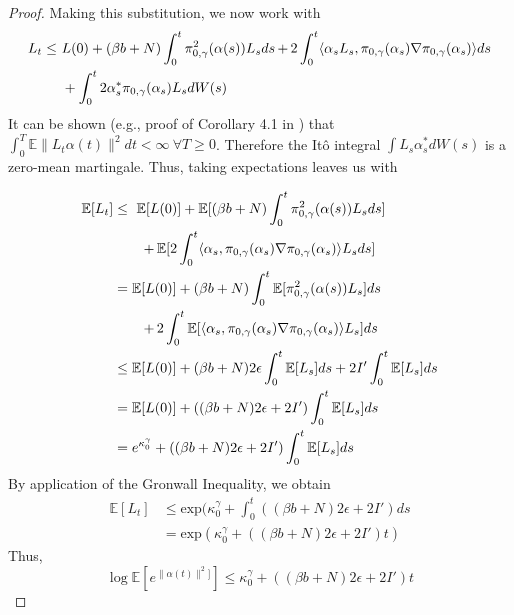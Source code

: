 \documentclass[journal,onecolumn]{IEEEtran}
\newcommand{\step}{\epsilon}
\newcommand{\grad}{\nabla}
\newcommand{\CE}{\mathbb{E}}
\newcommand{\alt}{\alpha(t)}
\newcommand{\als}{\alpha(s)}
\newcommand{\altss}{\alpha_s}
\newcommand{\Lt}{L_t}
\newcommand{\Lss}{L_s}
\newcommand{\browns}{W(s)}
\newcommand{\dimn}{N}
\newcommand{\kn}{\kappa_0}
\newcommand{\knw}{\kn^{\idw}}
\newcommand{\ids}{\pi}
\newcommand{\idw}{\gamma}
\newcommand{\isp}{0,\idw}
\newcommand{\idiffcc}{I'}
\newcommand{\dissb}{b}
\newcommand{\idistrw}{\ids_{\isp}}
\begin{document}
{\begin{proof}
Making this substitution, we now work with
\begin{align*}
    \begin{split}
        \Lt \leq \ &L(0) + (\beta \dissb + \dimn) \int_0^t \idistrw^2(\als) \Lss ds \,\color{black}{+}\, 2 \int_0^t \langle  \altss \Lss , \idistrw(\altss)\grad \idistrw(\altss) \rangle ds \\& + \int_0^t 2\altss^{*}\idistrw(\altss)\Lss d\browns
    \end{split}
\end{align*}
It can be shown (e.g., proof of Corollary 4.1 in \cite{djellout2004transportation}) that $\int_0^T\CE\|\Lt\alt\|^2dt < \infty \ \forall T \geq 0$. Therefore the It\^o integral $\int \Lss \altss^*d\browns$ is a zero-mean martingale. Thus, taking expectations leaves us with

\begin{align*}
    \begin{split}
        \CE[\Lt] &\leq \ \CE[L(0)] + \CE[(\beta \dissb + \dimn)\int_0^t \idistrw^2(\als) \Lss ds] \\&\quad \quad \,\color{black}{+}\, \CE[2 \int_0^t \langle  \altss, \idistrw(\altss)\grad \idistrw(\altss) \rangle \Lss ds] \\
        &= \CE[L(0)] + (\beta \dissb + \dimn)\int_0^t \CE[\idistrw^2(\als) \Lss]ds \\&\quad \quad \,\color{black}{+}\, 2\int_0^t \CE[\langle  \altss, \idistrw(\altss) \grad \idistrw(\altss) \rangle\Lss] ds \\
        &\leq \CE[L(0)] + (\beta \dissb + \dimn)2  \step \int_0^t \CE[\Lss]ds +
        2 \idiffcc \int_0^t \CE[\Lss] ds \\
        & = \CE[L(0)] + ((\beta \dissb + \dimn)2\step + 2\idiffcc)\int_0^t \CE[\Lss]ds  \\
        &= e^{\knw} + ((\beta \dissb + \dimn)2\step + 2 \idiffcc) \int_0^t \CE[\Lss]ds
    \end{split}
\end{align*}
By application of the Gronwall Inequality, we obtain
\begin{align*}
    \CE[\Lt] &\leq \textrm{exp}(\knw + \int_0^t ((\beta \dissb + \dimn)2\step + 2 \idiffcc)  ds \\&=  \textrm{exp}(\knw + ((\beta \dissb + \dimn)2\step + 2 \idiffcc)  t)
\end{align*}
Thus,
\[\log\CE[e^{\|\alt\|^2]}] \leq \knw + ((\beta \dissb + \dimn)2\step + 2 \idiffcc)  t \]
\end{proof}

}
\end{document}
